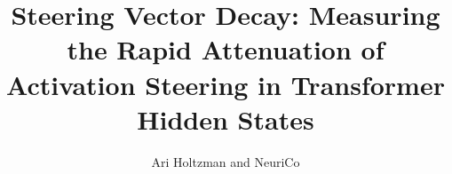 \documentclass{article}
\title{Steering Vector Decay: Measuring the Rapid Attenuation of Activation Steering in Transformer Hidden States}
\author{Ari Holtzman and NeuriCo}
\begin{document}
\maketitle

\begin{abstract}

\end{abstract}










\end{document}
